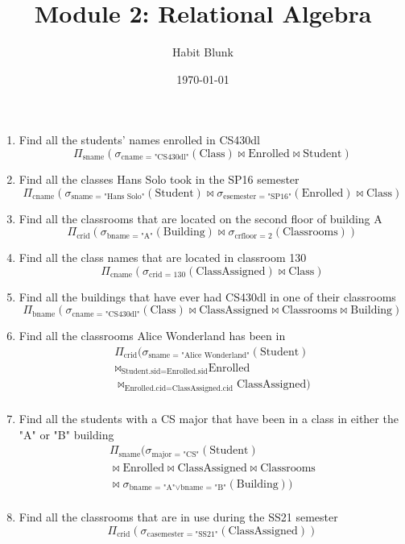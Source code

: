 \documentclass[fleqn]{article}
\title{Module 2: Relational Algebra}
\author{Habit Blunk}
\date{\today}
\begin{document}
\maketitle

\begin{enumerate}
  \item Find all the students' names enrolled in CS430dl
    \[
    \Pi_{\text{sname}} \left( \sigma_{\text{cname = "CS430dl"}} (\text{Class}) \bowtie \text{Enrolled} \bowtie \text {Student} \right)
    \]

  \item Find all the classes Hans Solo took in the SP16 semester
    \[
    \Pi_{\text{cname}} \left( \sigma_{\text{sname = "Hans Solo"}} (\text{Student}) \bowtie \sigma_{\text{esemester = "SP16"}} (\text{Enrolled}) \bowtie \text{Class} \right)
    \]

  \item Find all the classrooms that are located on the second floor of building A
    \[
    \Pi_{\text{crid}} \left( \sigma_{\text{bname = "A"}} (\text{Building}) \bowtie \sigma_{\text{crfloor = 2}} (\text{Classrooms}) \right)
    \]

  \item Find all the class names that are located in classroom 130
    \[
    \Pi_{\text{cname}} \left( \sigma_{\text{crid = 130}} (\text{ClassAssigned}) \bowtie \text{Class} \right)
    \]

  \item Find all the buildings that have ever had CS430dl in one of their classrooms
    \[
    \Pi_{\text{bname}} \left( \sigma_{\text{cname = "CS430dl"}} (\text{Class}) \bowtie \text{ClassAssigned} \bowtie \text{Classrooms} \bowtie \text{Building} \right)
    \]

  \item Find all the classrooms Alice Wonderland has been in
    \begin{multline*}
    \Pi_{\text{crid}} \big( \sigma_{\text{sname = "Alice Wonderland"}} (\text{Student}) \\
    \Join_{\text{Student.sid} = \text{Enrolled.sid}} \text{Enrolled} \\
    \Join_{\text{Enrolled.cid} = \text{ClassAssigned.cid}} \text{ClassAssigned} \big) \\
    \end{multline*}

  \item Find all the students with a CS major that have been in a class in either the "A" or "B" building
    \begin{multline*}
    \Pi_{\text{sname}} \big( \sigma_{\text{major = "CS"}} (\text{Student}) \\
    \bowtie \text{Enrolled} \bowtie \text{ClassAssigned} \bowtie \text{Classrooms} \\
    \bowtie \sigma_{\text{bname = "A"} \lor \text{bname = "B"}} (\text{Building}) \big) \\
    \end{multline*}

  \item Find all the classrooms that are in use during the SS21 semester
    \[
    \Pi_{\text{crid}} \left( \sigma_{\text{casemester = "SS21"}} (\text{ClassAssigned}) \right)
    \]
\end{enumerate}
\end{document}
